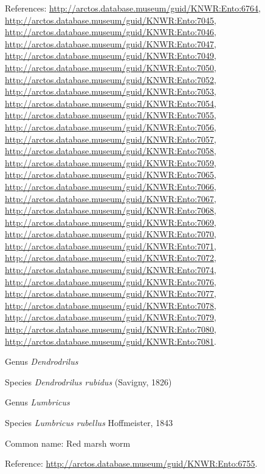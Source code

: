 \documentclass[9pt, article]{memoir}
\begin{document}
\begin{multicols}{2}
References: 
\url{http://arctos.database.museum/guid/KNWR:Ento:6764}, 
\url{http://arctos.database.museum/guid/KNWR:Ento:7045}, 
\url{http://arctos.database.museum/guid/KNWR:Ento:7046}, 
\url{http://arctos.database.museum/guid/KNWR:Ento:7047}, 
\url{http://arctos.database.museum/guid/KNWR:Ento:7049}, 
\url{http://arctos.database.museum/guid/KNWR:Ento:7050}, 
\url{http://arctos.database.museum/guid/KNWR:Ento:7052}, 
\url{http://arctos.database.museum/guid/KNWR:Ento:7053}, 
\url{http://arctos.database.museum/guid/KNWR:Ento:7054}, 
\url{http://arctos.database.museum/guid/KNWR:Ento:7055}, 
\url{http://arctos.database.museum/guid/KNWR:Ento:7056}, 
\url{http://arctos.database.museum/guid/KNWR:Ento:7057}, 
\url{http://arctos.database.museum/guid/KNWR:Ento:7058}, 
\url{http://arctos.database.museum/guid/KNWR:Ento:7059}, 
\url{http://arctos.database.museum/guid/KNWR:Ento:7065}, 
\url{http://arctos.database.museum/guid/KNWR:Ento:7066}, 
\url{http://arctos.database.museum/guid/KNWR:Ento:7067}, 
\url{http://arctos.database.museum/guid/KNWR:Ento:7068}, 
\url{http://arctos.database.museum/guid/KNWR:Ento:7069}, 
\url{http://arctos.database.museum/guid/KNWR:Ento:7070}, 
\url{http://arctos.database.museum/guid/KNWR:Ento:7071}, 
\url{http://arctos.database.museum/guid/KNWR:Ento:7072}, 
\url{http://arctos.database.museum/guid/KNWR:Ento:7074}, 
\url{http://arctos.database.museum/guid/KNWR:Ento:7076}, 
\url{http://arctos.database.museum/guid/KNWR:Ento:7077}, 
\url{http://arctos.database.museum/guid/KNWR:Ento:7078}, 
\url{http://arctos.database.museum/guid/KNWR:Ento:7079}, 
\url{http://arctos.database.museum/guid/KNWR:Ento:7080}, 
\url{http://arctos.database.museum/guid/KNWR:Ento:7081}.

\vspace{6pt}\noindent\hspace{30pt}Genus \textit{Dendrodrilus}


\vspace{6pt}\noindent\hspace{36pt}Species \textit{Dendrodrilus rubidus} (Savigny, 1826)


\vspace{6pt}\noindent\hspace{30pt}Genus \textit{Lumbricus}


\vspace{6pt}\noindent\hspace{36pt}Species \textit{Lumbricus rubellus} Hoffmeister, 1843


Common name: Red marsh worm

Reference: 
\url{http://arctos.database.museum/guid/KNWR:Ento:6755}.


\end{multicols}
\end{document}
